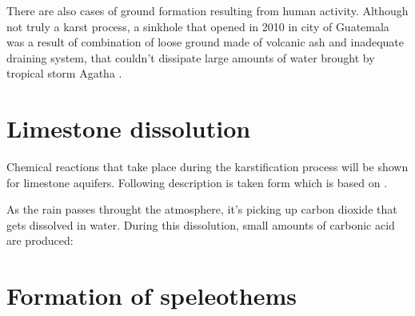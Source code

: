There are also cases of ground formation resulting from human activity.
Although not truly a karst process, a sinkhole that opened in 2010 in city of
Guatemala was a result of combination of loose ground made of volcanic ash and
inadequate draining system, that couldn't dissipate large amounts of water
brought by tropical storm Agatha \parencite{times2010}.

\section{Limestone dissolution}

Chemical reactions that take place during the karstification process will be
shown for limestone aquifers. Following description is taken form \cite{dreybrodt2002}
which is based on \cite{plummer1978}.

As the rain passes throught the atmosphere, it's picking up carbon dioxide that
gets dissolved in water. During this dissolution, small amounts of carbonic acid
are produced:

 


\section{Formation of speleothems}
